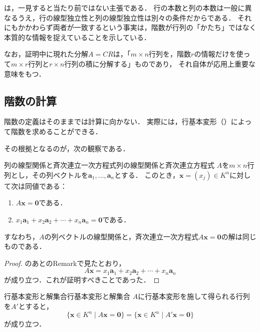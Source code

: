 \begin{remark}[行階数と列階数の一致の意味]
  は，一見すると当たり前ではない主張である．
  行の本数と列の本数は一般に異なるうえ，行の線型独立性と列の線型独立性は別々の条件だからである．
  それにもかかわらず両者が一致するという事実は，階数が行列の「かたち」ではなく本質的な情報を捉えていることを示している．

  なお，証明中に現れた分解$A = CR$は，「$m \times n$行列を，階数$r$の情報だけを使って$m \times r$行列と$r \times n$行列の積に分解する」ものであり，
  それ自体が応用上重要な意味をもつ．
\end{remark}

\subsection{階数の計算}

階数の定義はそのままでは計算に向かない．
実際には，行基本変形（）によって階数を求めることができる．

その根拠となるのが，次の観察である．

\begin{prop}{列の線型関係と斉次連立一次方程式}{列の線型関係と斉次連立方程式}
  $A$を$m \times n$行列とし，その列ベクトルを$\bm{a}_1, \dots, \bm{a}_n$とする．
  このとき，$\bm{x} = (x_j) \in K^n$に対して次は同値である：
  \begin{enumerate}[label=(\roman*),leftmargin=3.2em]
    \item $A\bm{x} = \bm{0}$である．
    \item $x_1 \bm{a}_1 + x_2 \bm{a}_2 + \cdots + x_n \bm{a}_n = \bm{0}$である．
  \end{enumerate}
  すなわち，$A$の列ベクトルの線型関係と，斉次連立一次方程式$A\bm{x} = \bm{0}$の解は同じものである．
\end{prop}

\begin{leftbar}
\begin{proof}
  のあとのRemarkで見たとおり，
  \[
    A\bm{x} = x_1 \bm{a}_1 + x_2 \bm{a}_2 + \cdots + x_n \bm{a}_n
  \]
  が成り立つ．これが証明すべきことであった．
\end{proof}
\end{leftbar}

\begin{prop}{行基本変形と解集合}{行基本変形と解集合}
  $A$に行基本変形を施して得られる行列を$A'$とすると，
  \[
    \{\bm{x} \in K^n \mid A\bm{x} = \bm{0}\}
    = \{\bm{x} \in K^n \mid A'\bm{x} = \bm{0}\}
  \]
  が成り立つ．
\end{prop}

